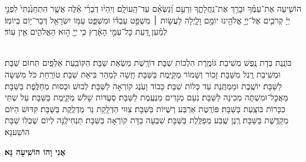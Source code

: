 \documentclass[twoside, openany, parskip=half, 11pt]{book}
\begin{document}
\anivho

\newcommand{\hoshia}{
	הוֹשִׁ֤יעָה \source{תהלים כח}אֶת־עַמֶּ֗ךָ וּבָרֵ֥ךְ אֶת־נַֽחֲלָתֶ֑ךָ וּֽרְעֵ֥ם וְ֝נַשְּׂאֵ֗ם עַד־הָֽעוֹלָֽם׃ \source{מל״א ח}וְיִֽהְי֨וּ דְבָרַ֜י אֵ֗לֶּה אֲשֶׁ֤ר הִתְחַנַּ֙נְתִּי֙ לִפְנֵ֣י יְיָ֔ קְרֹבִ֛ים אֶל־יְיָ֥ אֱלֹהֵ֖ינוּ יוֹמָ֣ם וָלָ֑יְלָה לַעֲשׂ֣וֹת ׀ מִשְׁפַּ֣ט עַבְדּ֗וֹ וּמִשְׁפַּ֛ט עַמּ֥וֹ יִשְׂרָאֵ֖ל דְּבַר־י֥וֹם בְּיוֹמֽוֹ׃ לְמַ֗עַן דַּ֚עַת כׇּל־עַמֵּ֣י הָאָ֔רֶץ כִּ֥י יְיָ֖ ה֣וּא הָאֱלֹהִ֑ים אֵ֖ין עֽוֹד׃
}

\hoshia


\sepline

\label{hoshanotshabbat}
\\
בּוֹנֶֽנֶת בְּדָת נֶֽפֶשׁ מְשִׁיבַת׃ גּוֹמֶֽרֶת הִלְכוֹת שַׁבָּת׃ דּוֹרֶֽשֶׁת מַשְׂאַת שַׁבָּת׃ הַקּוֹבַֽעַת אַלְפַּֽיִם תְּחוּם שַׁבָּת׃ וּמְשִֽׁיבַת רֶֽגֶל מִשַּׁבָּת׃ זָכוֹר וְשָׁמוֹר מְקַיֶּֽמֶת בַּשַּׁבָּת׃ חָֽשָׁה לְמַהֵר בִּיאַת שַׁבָּת׃ טוֹרַֽחַת כֹּל מִשִּׁשָּה לַשַּׁבָּת׃ יוֹשֶֽׁבֶת וּמַמְתֶּֽנֶת עַד כְּלוֹת שַׁבָּת׃ כָּבוֹד וָעֹֽנֶג קוֹרְאָה לַשַּׁבָּת׃ לְבוּשׁ וּכְסוּת מְחַלֶּֽפֶת בַּשַּׁבָּת׃ מַאֲכׇל־וּמִשְׁתֶּה מְכִינָה לַשַּׁבָּת׃ נֹֽעַם מְגָדִים מַנְעֶֽמֶת לַשַּׁבָּת׃ סְעֻדּוֹת שָׁלֹשׁ מְקַיֶּֽמֶת בַּשַּׁבָּת׃ עַל שְׁתֵּי כִכָּרוֹת בּוֹצַֽעַת בַּשַּׁבָּת׃ פּוֹרֶֽטֶת אַרְבַּע רְשֻׁיּוֹת בַּשַּׁבָּת׃ צִוּוּי הַדְלָֽקַת נֵר מַדְלֶֽקֶת בַּשַּׁבָּת׃ קִדּוּשׁ הַיּוֹם מְקַדֶּֽשֶׁת בַּשַּׁבָּת׃ רֶֽנֶן שֶֽׁבַע מְפַלֶּֽלֶת בַּשַּׁבָּת׃ שִׁבְעָה בַדָּת קוֹרְאָה בַּשַּׁבָּת׃ תַּנְחִילֶֽנָּה לְיוֹם שֶׁכֻּלּוֹ שַׁבָּת הוֹשַׁענָא׃

\begin{large}
	\textbf{אֲנִי וָהוֹ הוֹשִֽׁיעָה נָּא׃}
\end{large}
\end{document}
